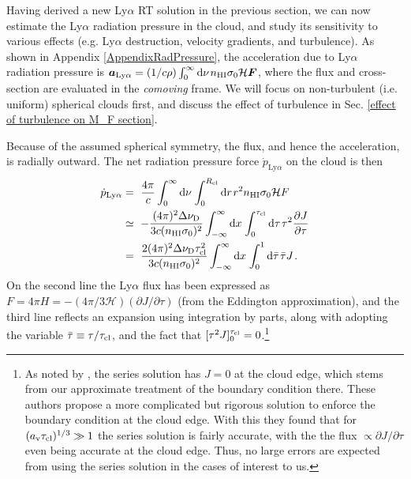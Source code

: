 \documentclass[fleqn,usenatbib]{mnras}
\begin{document}
\begin{figure}
\label{M_F analytical vs MCRT}
\end{figure}

Having derived a new Ly$\alpha$ RT solution in the previous section, we can now estimate the Ly$\alpha$ radiation pressure in the cloud, and study its sensitivity to various effects (e.g. Ly$\alpha$ destruction, velocity gradients, and turbulence). As shown in Appendix \ref{AppendixRadPressure}, the acceleration due to Ly$\alpha$ radiation pressure is $\boldsymbol{a}_{\rm Ly\alpha} = (1/c\rho) \int_{0}^{\infty}\textrm{d}\nu \hspace{1 pt} n_{\rm HI} \sigma_0 \mathcal{H} \boldsymbol{F}$, where the flux and cross-section are evaluated in the \textit{comoving} frame. We will focus on non-turbulent (i.e. uniform) spherical clouds first, and discuss the effect of turbulence in Sec. \ref{effect of turbulence on M_F section}.

Because of the assumed spherical symmetry, the flux, and hence the acceleration, is radially outward. The net radiation pressure force $\Dot{p}_{\textrm{Ly}\alpha}$ on the cloud is then
\begin{align}
    \Dot{p}_{\textrm{Ly}\alpha} &=~ \dfrac{4 \pi}{c} \int_{0}^{\infty} \textrm{d}\nu \hspace{1 pt} \int_{0}^{R_{\rm cl}} \textrm{d}r \hspace{1 pt} r^2 n_{\rm HI} \sigma_0 \mathcal{H} F \nonumber \\ &\simeq~ -\dfrac{(4 \pi)^2 \Delta \nu_{\rm D}}{3c( n_{\rm HI} \sigma_0)^2} \int_{-\infty}^{\infty} \textrm{d}x \hspace{1 pt} \int_{0}^{\tau_{\rm cl}} \textrm{d}\tau \hspace{1 pt} \tau^2  \dfrac{\partial J}{\partial \tau} \nonumber \\  &=~ \dfrac{2(4 \pi)^2 \Delta \nu_{\rm D} \tau_{\rm cl}^2}{3c( n_{\rm HI} \sigma_0)^2} \int_{-\infty}^{\infty} \textrm{d}x \hspace{1 pt}  \int_{0}^{1} \textrm{d}\Bar{\tau} \hspace{1 pt} \Bar{\tau} J   \hspace{1 pt} \label{Pdot general}.
\end{align}
On the second line the Ly$\alpha$ flux has been expressed as $F = 4 \pi H = - (4 \pi/3 \mathcal{H})(\partial J/\partial \tau)$ (from the Eddington approximation), and the third line reflects an expansion using integration by parts, along with adopting the variable $\Bar{\tau} \equiv \tau/\tau_{\rm cl}$, and the fact that $[\tau^2 J]_{0}^{\tau_{\rm cl}} = 0$.\footnote{As noted by \cite{McClellan2022}, the series solution has $J = 0$ at the cloud edge, which stems from our approximate treatment of the boundary condition there. These authors propose a more complicated but rigorous solution to enforce the boundary condition at the cloud edge. With this they found that for $(a_{\rm v} \tau_{\rm cl})^{1/3} \gg 1$ the series solution is fairly accurate, with the the flux $\propto \partial J/\partial \tau$ even being accurate at the cloud edge. Thus, no large errors are expected from using the series solution in the cases of interest to us.} 
\end{document}
